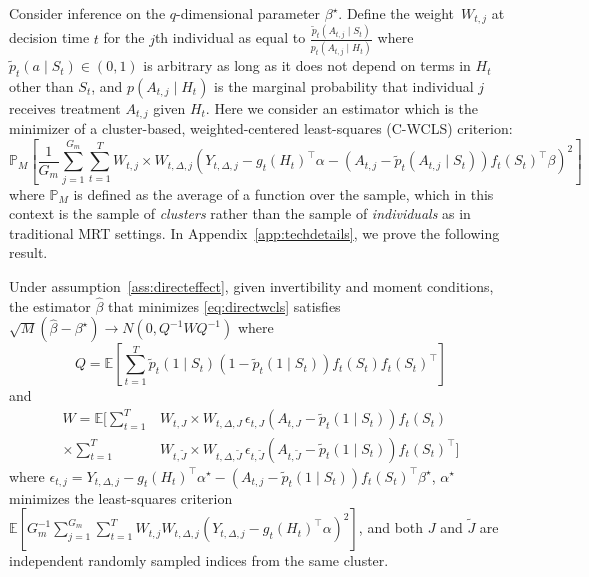 \documentclass[lineno]{biometrika}
\begin{document}
Consider inference on the $q$-dimensional parameter $\beta^\star$. Define the weight~$W_{t,j}$ at decision time $t$ for the $j$th individual as equal to $\frac{\tilde p_t (A_{t,j} \mid S_t)}{p_t (A_{t,j} \mid H_t)}$ where $\tilde p_t (a \mid S_t)\in (0,1)$ is arbitrary as long as it does not depend on terms in $H_t$ other than $S_t$, and $p(A_{t,j} \mid H_t)$ is the marginal probability that individual $j$ receives treatment $A_{t,j}$ given $H_t$.  
Here we consider an estimator which is the minimizer of a cluster-based, weighted-centered least-squares (C-WCLS) criterion:
\begin{equation}
\label{eq:directwcls}
\mathbb{P}_M \left[ \frac{1}{G_m} \sum_{j=1}^{G_m} \sum_{t=1}^T W_{t,j} \times W_{t,\Delta,j} \left(Y_{t,\Delta,j} - g_t (H_t)^\top \alpha - (A_{t,j} - \tilde p_t (A_{t,j} \mid S_t)) f_t(S_t)^\top \beta \right)^2 \right]
\end{equation}
where $\mathbb{P}_M$ is defined as the average of a function over the sample, which in this context is the sample of \emph{clusters} rather than the sample of \emph{individuals} as in traditional MRT settings. In Appendix~\ref{app:techdetails}, we prove the following result.

\begin{lemma}
\label{lemma:asymnorm}
Under assumption~\ref{ass:directeffect}, given invertibility and moment conditions, the estimator $\hat \beta$ that minimizes \eqref{eq:directwcls} satisfies $\sqrt{M} \left(\hat \beta - \beta^\star \right) \to N(0, Q^{-1} W Q^{-1})$ where
$$
Q = \mathbb{E} \left[ \sum_{t=1}^T \tilde p_t( 1 \mid S_{t} ) ( 1- \tilde p_t( 1 \mid S_{t} )) f_t (S_t) f_t (S_t)^\top \right]
$$
and
\begin{align*}
W =  \mathbb{E} \bigg[ \sum_{t=1}^T &W_{t,J} \times W_{t,\Delta,J} \, \epsilon_{t,J} ( A_{t,J} - \tilde p_t( 1 \mid S_{t} )) f_t (S_t) \\
\times \sum_{t=1}^T &W_{t, \tilde J} \times W_{t,\Delta,\tilde J} \, \epsilon_{t, \tilde J} ( A_{t, \tilde J} - \tilde p_t( 1 \mid S_{t} )) f_t (S_t)^\top  \bigg]
\end{align*}
where $\epsilon_{t,j} = Y_{t,\Delta, j} - g_t(H_t)^\top \alpha^\star - (A_{t,j} - \tilde p_t (1 \mid S_t) ) f_t (S_t)^\top \beta^\star$, $\alpha^\star$ minimizes the least-squares criterion $\mathbb{E}  \left[G_m^{-1} \sum_{j=1}^{G_m} \sum_{t=1}^T W_{t,j} W_{t,\Delta,j} \left( Y_{t,\Delta,j} - g_t(H_t)^\top \alpha \right)^2 \right]$, and both $J$ and $\tilde J$ are independent randomly sampled indices from the same cluster.
\end{lemma}
\end{document}
